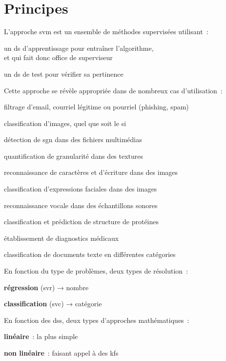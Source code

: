 \section{Principes}

L’approche \gls{svm} est un ensemble de méthodes supervisées utilisant :
\begin{enum}
\item{un \gls{ds} d’apprentissage pour entraîner l’algorithme,\\
et qui fait donc office de superviseur}
\item{un \gls{ds} de test pour vérifier sa pertinence}
\end{enum}

Cette approche se révèle appropriée dans de nombreux cas d’utilisation :
\begin{itmz}
\item{filtrage d’email, courriel légitime ou pourriel (phishing, spam)}
\item{classification d’images, quel que soit le \gls{si}}
\item{détection de \gls{sgn} dans des fichiers multimédias}
\item{quantification de granularité dans des textures}
\item{reconnaissance de caractères et d’écriture dans des images}
\item{classification d’expressions faciales dans des images}
\item{reconnaissance vocale dans des échantillons sonores}
\item{classification et prédiction de structure de protéines}
\item{établissement de diagnostics médicaux}
\item{classification de documents texte en différentes catégories}
\end{itmz}

En fonction du type de problèmes, deux types de résolution :
\begin{itmz}
\item{\textbf{régression} (\gls{svr}) → nombre}
\item{\textbf{classification} (\gls{svc}) → catégorie}
\end{itmz}

En fonction des \glspl{ds}, deux types d’approches mathématiques :
\begin{itmz}
\item{\textbf{linéaire} : la plus simple}
\item{\textbf{non linéaire} : faisant appel à des \glspl{kf}}
\end{itmz}

